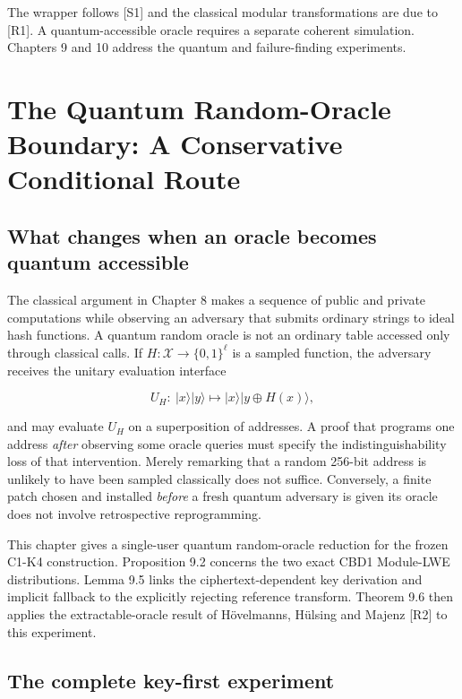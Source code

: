 \documentclass[
  11pt,
  a4paper,
  oneside]{report}
\begin{document}
The wrapper follows {[}S1{]} and the classical modular transformations
are due to {[}R1{]}. A quantum-accessible oracle requires a separate
coherent simulation. Chapters 9 and 10 address the quantum and
failure-finding experiments.

\chapter{The Quantum Random-Oracle Boundary: A Conservative Conditional
Route}\label{the-quantum-random-oracle-boundary-a-conservative-conditional-route}

\section{What changes when an oracle becomes quantum
accessible}\label{what-changes-when-an-oracle-becomes-quantum-accessible}

The classical argument in Chapter 8 makes a sequence of public and
private computations while observing an adversary that submits ordinary
strings to ideal hash functions. A quantum random oracle is not an
ordinary table accessed only through classical calls. If
\(H:\mathcal X\to\{0,1\}^{\ell}\) is a sampled function, the adversary
receives the unitary evaluation interface

\[
U_H:\ |x\rangle|y\rangle\longmapsto|x\rangle|y\oplus H(x)\rangle,
\]

and may evaluate \(U_H\) on a superposition of addresses. A proof that
programs one address \emph{after} observing some oracle queries must
specify the indistinguishability loss of that intervention. Merely
remarking that a random 256-bit address is unlikely to have been sampled
classically does not suffice. Conversely, a finite patch chosen and
installed \emph{before} a fresh quantum adversary is given its oracle
does not involve retrospective reprogramming.

This chapter gives a single-user quantum random-oracle reduction for the
frozen C1-K4 construction. Proposition 9.2 concerns the two exact CBD1
Module-LWE distributions. Lemma 9.5 links the ciphertext-dependent key
derivation and implicit fallback to the explicitly rejecting reference
transform. Theorem 9.6 then applies the extractable-oracle result of
Hövelmanns, Hülsing and Majenz {[}R2{]} to this experiment.

\section{The complete key-first
experiment}\label{the-complete-key-first-experiment}
\end{document}
